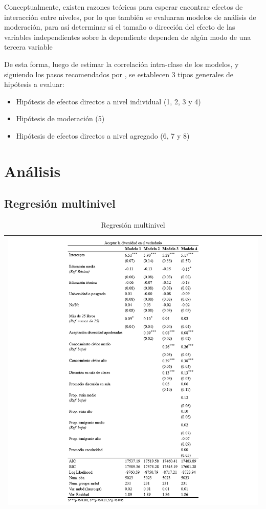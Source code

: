 \documentclass[12pt,twoside]{templates/facsothesis}
\begin{document}
Conceptualmente, existen razones teóricas para esperar encontrar efectos de interacción entre niveles, por lo que también se evaluaran modelos de análisis de moderación, para así determinar si el tamaño o dirección del efecto de las variables independientes sobre la dependiente dependen de algún modo de una tercera variable \citep{hayes_introduction_2022}

De esta forma, luego de estimar la correlación intra-clase de los modelos, y siguiendo los pasos recomendados por \citet{aguinis_BestPractice_2013}, se establecen 3 tipos generales de hipótesis a evaluar:

\begin{itemize}
\item
  Hipótesis de efectos directos a nivel individual (1, 2, 3 y 4)
\item
  Hipótesis de moderación (5)
\item
  Hipótesis de efectos directos a nivel agregado (6, 7 y 8)
\end{itemize}

\hypertarget{anuxe1lisis}{%
\chapter{Análisis}\label{anuxe1lisis}}

\hypertarget{regresiuxf3n-multinivel}{%
\section{Regresión multinivel}\label{regresiuxf3n-multinivel}}

\begin{longtable}[]{@{}l@{}}
\caption{\label{tab:reg}Regresión multinivel}\tabularnewline
\toprule()
\endhead
\includegraphics{IPO/output/tables/reg.png} \\
\bottomrule()
\end{longtable}
\end{document}
